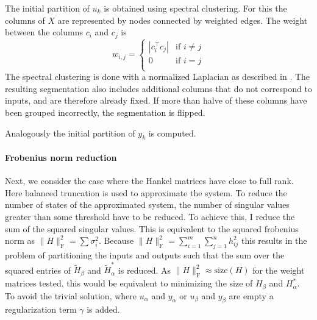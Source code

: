 \documentclass[numbers=noenddot,doctype=mastersthesis,BCOR=15mm,biblatex]{ldvbook}%
\begin{document}
The initial partition of $u_k$ is obtained using spectral clustering.
For this the columns of $X$ are represented by nodes connected by weighted edges.
The weight between the columns $c_i$ and $c_j$ is  
\begin{equation}
w_{i,j}=
\begin{cases}
|c_i^\top c_j| & \text{if } i\neq j\\
0  & \text{if } i=j\\
\end{cases}
\end{equation}
The spectral clustering is done with a normalized Laplacian as described in \cite{higham_spectral_2007}.
The resulting segmentation also includes additional columns that do not correspond to inputs, and are therefore already fixed.
If more than halve of these columns have been grouped incorrectly, the segmentation is flipped.

Analogously the initial partition of $y_k$ is computed.


\paragraph{Frobenius norm reduction}
Next, we consider the case where the Hankel matrices have close to full rank.
Here balanced truncation is used to approximate the system.
To reduce the number of states of the approximated system, the number of singular values greater than some threshold have to be reduced.
To achieve this, I reduce the sum of the squared singular values.
This is equivalent to the squared frobenius norm as $\|H\|_\text{F}^2 = \sum \sigma_i^2$. 
Because $\|H\|_\text{F}^2 = \sum_{i=1}^{m}\sum_{j=1}^{n} h_{ij}^2$ this results in the problem of partitioning the inputs and outputs such that the sum over the squared entries of $\tilde{H}_\beta$ and $\tilde{H}_\alpha^*$ is reduced.
As $\|H\|_\text{F}^2 \approx \text{size}(H)$ for the weight matrices tested, this would be equivalent to minimizing the size of $H_\beta$ and $H_\alpha^*$.
To avoid the trivial solution, where $u_\alpha$ and $y_\alpha$ or $u_\beta$  and $y_\beta$ are empty a regularization term $\gamma$ is added.
\end{document}
